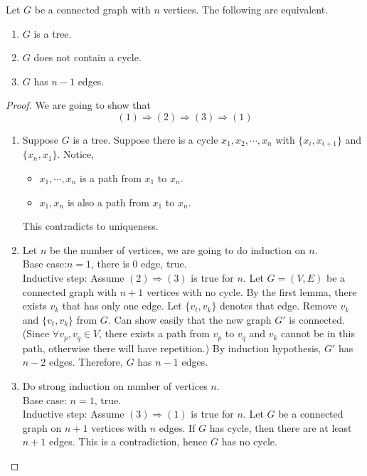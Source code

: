 \begin{theorem}
    Let $G$ be a connected graph with $n$ vertices. The following are equivalent.
    \begin{enumerate}
        \item $G$ is a tree.
        \item $G$ does not contain a cycle.
        \item $G$ has $n-1$ edges.
    \end{enumerate}
\end{theorem}
\begin{proof}
    We are going to show that
    $$(1) \Longrightarrow (2) \Longrightarrow (3) \Longrightarrow (1)$$
    \begin{enumerate}
        \item Suppose $G$ is a tree. Suppose there is a cycle $x_1,x_2,\cdots,x_n$ with $\{x_i,x_{i+1}\}$ and $\{x_n,x_1\}$. 
        Notice, 
        \begin{itemize}
            \item $x_1,\cdots,x_n$ is a path from $x_1$ to $x_n$.
            \item $x_1,x_n$ is also a path from $x_1$ to $x_n$.
        \end{itemize}
        This contradicts to uniqueness.
        \item Let $n$ be the number of vertices, we are going to do induction on $n$.\\
        Base case:$n=1$, there is 0 edge, true.\\
        Inductive step: Assume $(2) \Longrightarrow (3)$ is true for $n$. 
        Let $G=(V,E)$ be a connected graph with $n+1$ vertices with no cycle. 
        By the first lemma, there exists $v_k$ that has only one edge. 
        Let $\{v_t,v_k\}$ denotes that edge. Remove $v_k$ and $\{v_t,v_k\}$ from $G$. Can show easily that the new graph $G'$ is connected. (Since $\forall v_p,v_q \in V$, there exists a path from $v_p$ to $v_q$ and $v_k$ cannot be in this path, otherwise there will have repetition.)
        By induction hypothesis, $G'$ has $n-2$ edges. Therefore, $G$ has $n-1$ edges.
        \item Do strong induction on number of vertices $n$.\\
        Base case: $n=1$, true.\\
        Inductive step: Assume $(3) \Longrightarrow (1)$ is true for $n$. 
        Let $G$ be a connected graph on $n+1$ vertices with $n$ edges. 
        If $G$ has cycle, then there are at least $n+1$ edges. This is a contradiction, hence $G$ has no cycle. 

\end{enumerate}
\end{proof}
